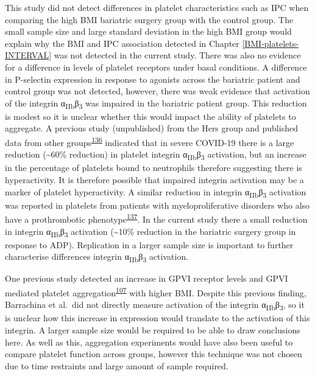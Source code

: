 \documentclass[11pt,twoside]{bristolthesis}
\begin{document}
This study did not detect differences in platelet characteristics such as IPC when comparing the high BMI bariatric surgery group with the control group. The small sample size and large standard deviation in the high BMI group would explain why the BMI and IPC association detected in Chapter \ref{BMI-platelets-INTERVAL} was not detected in the current study. There was also no evidence for a difference in levels of platelet receptors under basal conditions. A difference in P-selectin expression in response to agonists across the bariatric patient and control group was not detected, however, there was weak evidence that activation of the integrin α\textsubscript{IIb}β\textsubscript{3} was impaired in the bariatric patient group. This reduction is modest so it is unclear whether this would impact the ability of platelets to aggregate. A previous study (unpublished) from the Hers group and published data from other groups\textsuperscript{\protect\hyperlink{ref-Taus2020}{136}} indicated that in severe COVID-19 there is a large reduction (\textasciitilde60\% reduction) in platelet integrin α\textsubscript{IIb}β\textsubscript{3} activation, but an increase in the percentage of platelets bound to neutrophils therefore suggesting there is hyperactivity. It is therefore possible that impaired integrin activation may be a marker of platelet hyperactivity. A similar reduction in integrin α\textsubscript{IIb}β\textsubscript{3} activation was reported in platelets from patients with myeloproliferative disorders who also have a prothrombotic phenotype\textsuperscript{\protect\hyperlink{ref-Moore2013}{137}}. In the current study there a small reduction in integrin α\textsubscript{IIb}β\textsubscript{3} activation (\textasciitilde10\% reduction in the bariatric surgery group in response to ADP). Replication in a larger sample size is important to further characterise differences integrin α\textsubscript{IIb}β\textsubscript{3} activation.

One previous study detected an increase in GPVI receptor levels and GPVI mediated platelet aggregation\textsuperscript{\protect\hyperlink{ref-Barrachina2019}{107}} with higher BMI. Despite this previous finding, Barrachina et al.~did not directly measure activation of the integrin α\textsubscript{IIb}β\textsubscript{3}, so it is unclear how this increase in expression would translate to the activation of this integrin. A larger sample size would be required to be able to draw conclusions here. As well as this, aggregation experiments would have also been useful to compare platelet function across groups, however this technique was not chosen due to time restraints and large amount of sample required.
\end{document}
